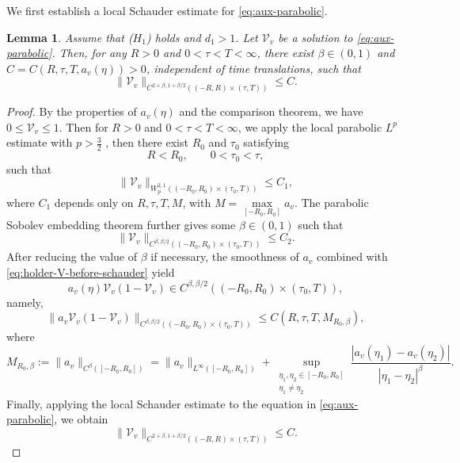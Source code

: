 \documentclass[preprint,sort&compress,final,12pt]{elsarticle}
\newtheorem{lemma}[theorem]{Lemma}
\numberwithin{equation}{section}
\begin{document}
We first establish a local Schauder estimate for \eqref{eq:aux-parabolic}.
\begin{lemma}\label{lem:schauder}
Assume that ($H_1$) holds and $d_1>1$. Let $\mathcal V_v$ be a solution to \eqref{eq:aux-parabolic}. Then, for any $R>0$ and $0<\tau<T<\infty$, there exist $\beta\in(0,1)$ and $C=C(R,\tau,T,a_v(\eta))>0$, independent of time translations, such that
\begin{equation*}
\|\mathcal V_v\|_{C^{2+\beta,1+\beta/2}((-R,R)\times(\tau,T))}\le C.
\end{equation*}
\end{lemma}
\begin{proof} By the properties of $a_v(\eta)$ and the comparison theorem, we have $0\leq\mathcal V_v\leq1$. Then for $R>0$ and $0<\tau<T<\infty$, we apply the local parabolic $L^p$ estimate with $p>\frac32$ \cite[estimate (10.12), Section 10, Chapter IV]{Ladyzhenskaya}, then there exist $R_0$ and $\tau_0$ satisfying
\begin{equation*}
R<R_0,\qquad 0<\tau_0<\tau,
\end{equation*}
such that
\begin{equation*}
\|\mathcal V_v\|_{W^{2,1}_p((-R_0,R_0)\times(\tau_0,T))}\le C_1,
\end{equation*}
where $C_1$ depends only on $R,\tau,T,M$, with $M=\max\limits_{[-R_0,R_0]}a_v$. The parabolic Sobolev embedding theorem \cite[Lemma 3.3, Chapter II]{Ladyzhenskaya} further gives some $\beta\in(0,1)$ such that
\begin{equation}\label{eq:holder-V-before-schauder}
\|\mathcal V_v\|_{C^{\beta,\beta/2}((-R_0,R_0)\times(\tau_0,T))}\le C_2.
\end{equation}
After reducing the value of $\beta$ if necessary, the smoothness of $a_v$ combined with \eqref{eq:holder-V-before-schauder} yield
\begin{equation*}
a_v(\eta)\mathcal V_v(1-\mathcal V_v)\in C^{\beta,\beta/2}((-R_0,R_0)\times(\tau_0,T)),
\end{equation*}
namely,
\begin{equation*}
\|a_v\mathcal V_v(1-\mathcal V_v)\|_{C^{\beta,\beta/2}((-R_0,R_0)\times(\tau_0,T))}
\le C(R,\tau,T,M_{R_0,\beta}),
\end{equation*}
where
\begin{equation*}
M_{R_0,\beta}:=\|a_v\|_{C^\beta([-R_0,R_0])}=\|a_v\|_{L^\infty([-R_0,R_0])}+\sup_{\substack{\eta_1,\eta_2\in[-R_0,R_0]\\ \eta_1\neq\eta_2}}\frac{|a_v(\eta_1)-a_v(\eta_2)|}{|\eta_1-\eta_2|^\beta}.
\end{equation*}
Finally, applying the local Schauder estimate \cite[Theorem 10.1,Chapter IV]{Ladyzhenskaya} to the equation in \eqref{eq:aux-parabolic}, we obtain
\begin{equation*}
\|\mathcal V_v\|_{C^{2+\beta,1+\beta/2}((-R,R)\times(\tau,T))}\le C.
\end{equation*}


\end{proof}
\end{document}
